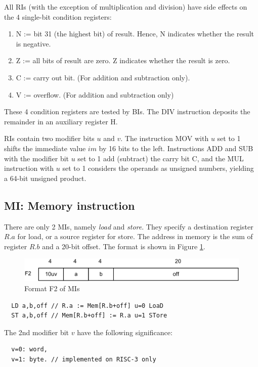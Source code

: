 All RIs (with the exception of multiplication and division) have side effects on the 4 single-bit
condition registers:
\begin{enumerate}
  \item N := bit 31 (the highest bit) of result. Hence, N indicates whether the result is negative.
  \item Z := all bits of result are zero. Z indicates whether the result is zero.
  \item C := carry out bit. (For addition and subtraction only).
  \item V := overflow. (For addition and subtraction only)
\end{enumerate}

These 4 condition registers are tested by BIs. The DIV instruction deposits the remainder in an
auxiliary register H.

RIs contain two modifier bits $u$ and $v$. The instruction MOV with $u$ set to 1 shifts the
immediate value $im$ by 16 bits to the left. Instructions ADD and SUB with the modifier bit $u$ set to 1
add (subtract) the carry bit C, and the MUL instruction with $u$ set to 1 considers the operands as
unsigned numbers, yielding a 64-bit unsigned product.

\subsection{MI: Memory instruction}
There are only 2 MIs, namely \emph{load} and \emph{store}. They specify a destination register
$R.a$ for load, or a source register for store. The address in memory is the sum of register $R.b$ and a
20-bit offset. The format is shown in Figure \ref{fig:mi}.
\begin{figure}[h!]
  \centering
  \includegraphics[width=.9\textwidth]{i/3.png}
  \caption{Format F2 of MIs}
  \label{fig:mi}
\end{figure}
\begin{verbatim}
  LD a,b,off // R.a := Mem[R.b+off] u=0 LoaD
  ST a,b,off // Mem[R.b+off] := R.a u=1 STore
\end{verbatim}

The 2nd modifier bit $v$ have the following significance:
\begin{verbatim}
  v=0: word,
  v=1: byte. // implemented on RISC-3 only
\end{verbatim}

